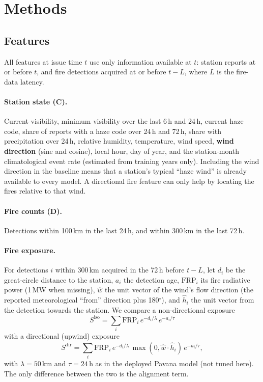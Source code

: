 \section{Methods}
\label{sec:methods}

\subsection{Features}

All features at issue time $t$ use only information available at $t$: station reports at or
before $t$, and fire detections acquired at or before $t-L$, where $L$ is the fire-data latency.

\paragraph{Station state (C).}
Current visibility, minimum visibility over the last 6\,h and 24\,h, current haze code, share of
reports with a haze code over 24\,h and 72\,h, share with precipitation over 24\,h, relative
humidity, temperature, wind speed, \textbf{wind direction} (sine and cosine), local hour, day of
year, and the station-month climatological event rate (estimated from training years only).
Including the wind direction in the baseline means that a station's typical ``haze wind'' is
already available to every model. A directional fire feature can only help by locating the fires
relative to that wind.

\paragraph{Fire counts (D).}
Detections within 100\,km in the last 24\,h, and within 300\,km in the last 72\,h.

\paragraph{Fire exposure.}
For detections $i$ within 300\,km acquired in the 72\,h before $t-L$, let $d_i$ be the
great-circle distance to the station, $a_i$ the detection age, $\mathrm{FRP}_i$ its fire radiative
power (1\,MW when missing), $\hat w$ the unit vector of the wind's flow direction (the reported
meteorological ``from'' direction plus 180$^\circ$), and $\hat h_i$ the unit vector from the
detection towards the station. We compare a non-directional exposure
\begin{equation}
  S^{\mathrm{iso}} = \sum_i \mathrm{FRP}_i\, e^{-d_i/\lambda}\, e^{-a_i/\tau}
\end{equation}
with a directional (upwind) exposure
\begin{equation}
  S^{\mathrm{dir}} = \sum_i \mathrm{FRP}_i\, e^{-d_i/\lambda}\, \max(0, \hat w\cdot\hat h_i)\, e^{-a_i/\tau},
\end{equation}
with $\lambda=50$\,km and $\tau=24$\,h as in the deployed Pavana model (not tuned here). The only
difference between the two is the alignment term.

